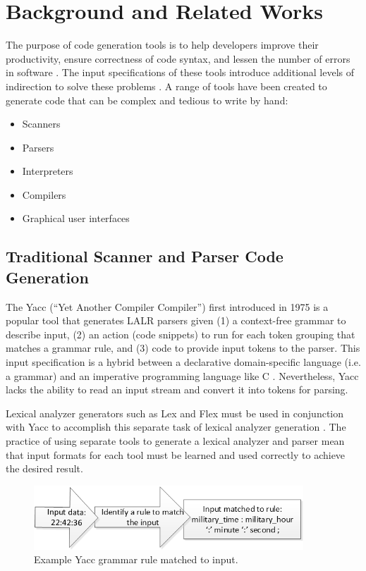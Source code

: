 \chapter{Background and Related Works}
The purpose of code generation tools is to help developers improve their productivity, ensure correctness of code syntax, and lessen the number of errors in software \cite{groher_01}.  The input specifications of these tools introduce additional levels of indirection to solve these problems \cite{spinellis_01}.  A range of tools have been created to generate code that can be complex and tedious to write by hand:
\begin{itemize}
  \item Scanners
  \item Parsers
  \item Interpreters
  \item Compilers
  \item Graphical user interfaces
\end{itemize}

\section{Traditional Scanner and Parser Code Generation}
The Yacc (“Yet Another Compiler Compiler”) \cite{johnson_01} first introduced in 1975 is a popular tool that generates LALR parsers given (1) a context-free grammar to describe input, (2) an action (code snippets) to run for each token grouping that matches a grammar rule, and (3) code to provide input tokens to the parser.  This input specification is a hybrid between a declarative domain-specific language (i.e. a grammar) and an imperative programming language like C \cite{demetrescu_01,lloyd_01,gifford_01}.  Nevertheless, Yacc lacks the ability to read an input stream and convert it into tokens for parsing.

\indent
Lexical analyzer generators such as Lex and Flex must be used in conjunction with Yacc to accomplish this separate task of lexical analyzer generation \cite{johnson_01,lesk_01}.  The practice of using separate tools to generate a lexical analyzer and parser mean that input formats for each tool must be learned and used correctly to achieve the desired result.

\begin{figure}[htbp]
\centering
\includegraphics[width=0.9\textwidth]{figures/YaccGrammarRule.png}
\caption{Example Yacc grammar rule matched to input.}
\label{fig:YaccGrammarRule}
\end{figure}

